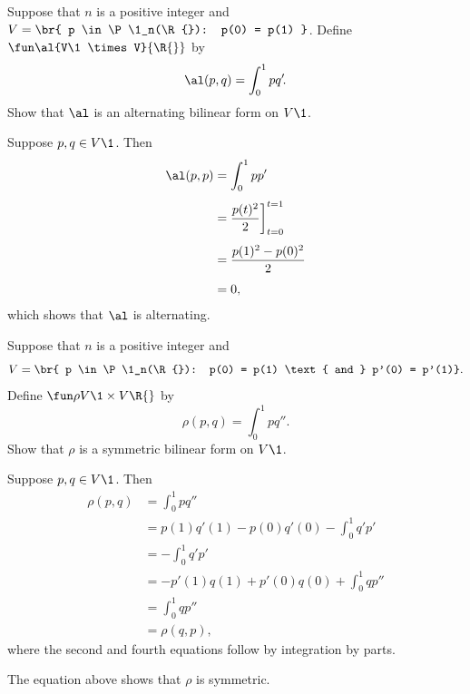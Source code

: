 \exercise
Suppose that $n$ is a positive integer and $V = \br{ p \in \P\1_n(\R{}): p(0) = p(1) }$.
Define $\fun \al {V\1 \times V} {\R{}}$ by
\[
\al(p,q) = \int_0^1 p q'\!.
\]
Show that $\al$ is an alternating bilinear form on $V\1$.

\begin{Solution}
Suppose $p, q \in V\1$. Then
\begin{align*}
\al(p, p) & = \int_0^1 p p' \\[4bp]
&= \frac{p(t)^2}{2} \bigg]_{t=0}^{t=1} \\[4bp]
&= \frac{ p(1)^2 - p(0)^2 }{2} \\[4bp]
&=0,
\end{align*}
which shows that $\al$ is alternating.
\end{Solution}

\exercise
Suppose that $n$ is a positive integer and
\[
V = \br{ p \in \P\1_n(\R{}): p(0) = p(1) \text{ and } p'(0) = p'(1)}.
\]
Define $\fun \rho {V\1 \times V} {\R{}}$ by
\[
\rho(p,q) = \int_0^1 p q''\!.
\]
Show that $\rho$ is a symmetric bilinear form on $V\1$.

\begin{Solution}
Suppose $p, q \in V\1$. Then
\begin{align*}
\rho(p, q) & = \int_0^1 p q'' \\[4bp]
&= p(1) q'(1) - p(0)q'(0) - \int_0^1 q' p' \\[4bp]
&= - \int_0^1 q' p' \\[4bp]
&= -p'(1) q(1) + p'(0)q(0) + \int_0^1 q p'' \\[4bp]
&= \int_0^1 q p'' \\[4bp]
&= \rho(q, p),
\end{align*}
where the second and fourth equations follow by integration by parts.

The equation above shows that $\rho$ is symmetric.
\end{Solution}

